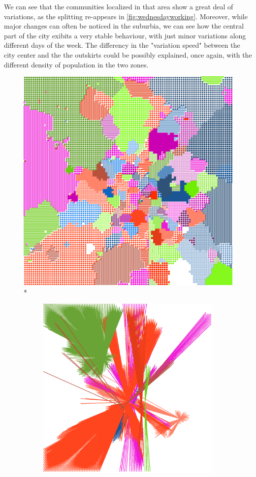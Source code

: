 \documentclass[12pt,a4paper]{article}
\begin{document}
We can see that the communities localized in that area show a great deal of variations, as the splitting re-appears in \ref{fig:wednesdayworking}.
Moreover, while major changes can often be noticed in the suburbia, we can see how the central part of the city exibits a very stable behaviour, with just minor variations along different days of the week.
The differency in the "variation speed" between the city center and the the outskirts could be possibly explained, once again, with the different density of population in the two zones.

\begin{figure}[H]
\centering
\includegraphics[width=0.8\linewidth]{weekDef/3Wed.png}
\\*
\begin{subfigure}[b]{0.3\textwidth}
\includegraphics[width=\textwidth]{weekDef/edges-3Wed-big.png}

\end{subfigure}
\end{figure}
\end{document}
